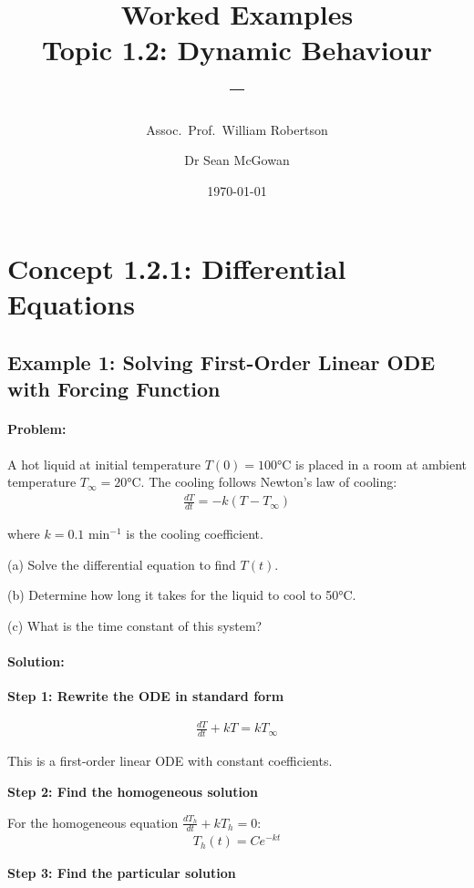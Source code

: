\documentclass[11pt,a4paper]{article}
\title{\textbf{Worked Examples}\\[0.5em]
\large Topic 1.2: Dynamic Behaviour\\[0.3em]
\normalsize \coursesubtitle{} -- \coursetitle}
\author{Assoc.\ Prof.\ William Robertson \and Dr Sean McGowan}
\date{\today}
\begin{document}
\maketitle
\tableofcontents
\newpage

\section{Concept 1.2.1: Differential Equations}

\subsection{Example 1: Solving First-Order Linear ODE with Forcing Function}

\paragraph{Problem:} A hot liquid at initial temperature $T(0) = 100$°C is placed in a room at ambient temperature $T_{\infty} = 20$°C. The cooling follows Newton's law of cooling:
\begin{align}
\frac{dT}{dt} = -k(T - T_{\infty})
\end{align}

where $k = 0.1$ min$^{-1}$ is the cooling coefficient.

(a) Solve the differential equation to find $T(t)$.

(b) Determine how long it takes for the liquid to cool to 50°C.

(c) What is the time constant of this system?

\paragraph{Solution:}

\textbf{Step 1: Rewrite the ODE in standard form}

\begin{align}
\frac{dT}{dt} + kT = kT_{\infty}
\end{align}

This is a first-order linear ODE with constant coefficients.

\textbf{Step 2: Find the homogeneous solution}

For the homogeneous equation $\frac{dT_h}{dt} + kT_h = 0$:
\begin{align}
T_h(t) = Ce^{-kt}
\end{align}

\textbf{Step 3: Find the particular solution}
\end{document}

